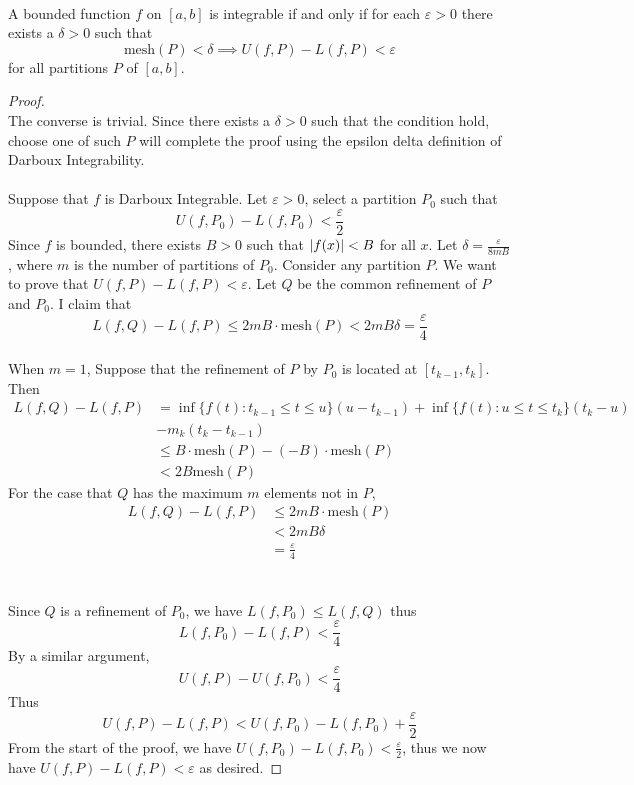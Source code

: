 \documentclass[a4paper]{article}
\begin{document}
\begin{thm}{}{}\\ A bounded function $f$ on $[a,b]$ is integrable if and only if for each $\varepsilon>0$ there exists a $\delta>0$ such that $$\text{mesh}(P)<\delta\implies U(f,P)-L(f,P)<\varepsilon$$ for all partitions $P$ of $[a,b]$. 
\begin{proof}\\ The converse is trivial. Since there exists a $\delta>0$ such that the condition hold, choose one of such $P$ will complete the proof using the epsilon delta definition of Darboux Integrability. \\~\\
Suppose that $f$ is Darboux Integrable. Let $\varepsilon>0$, select a partition $P_0$ such that $$U(f,P_0)-L(f,P_0)<\frac{\varepsilon}{2}$$ Since $f$ is bounded, there exists $B>0$ such that $\abs{f(x)}<B$ for all $x$. Let $\delta
=\frac{\varepsilon}{8mB}$, where $m$ is the number of partitions of $P_0$. Consider any partition $P$. We want to prove that $U(f,P)-L(f,P)<\varepsilon$. Let $Q$ be the common refinement of $P$ and $P_0$. I claim that $$L(f,Q)-L(f,P)\leq 2mB\cdot\text{mesh}(P)<2mB\delta=\frac{\varepsilon}{4}$$\\
When $m=1$, Suppose that the refinement of $P$ by $P_0$ is located at $[t_{k-1},t_k]$. Then 
\begin{align*}
L(f,Q)-L(f,P)&=\inf\{f(t):t_{k-1}\leq t\leq u\}(u-t_{k-1})+\inf\{f(t):u\leq t\leq t_k\}(t_k-u)\\
&-m_k(t_k-t_{k-1})\\
&\leq B\cdot\text{mesh}(P)-(-B)\cdot\text{mesh}(P)\tag{$-B$ is a minimum of $f(x)$}\\
&<2B\text{mesh}(P)
\end{align*}
For the case that $Q$ has the maximum $m$ elements not in $P$, 
\begin{align*}
L(f,Q)-L(f,P)&\leq 2mB\cdot\text{mesh}(P)\tag{Same argument as the case for $m=1$}\\
&<2mB\delta\\
&=\frac{\varepsilon}{4}\tag{constructed $\delta$}
\end{align*}
\\~\\
Since $Q$ is a refinement of $P_0$, we have $L(f,P_0)\leq L(f,Q)$ thus $$L(f,P_0)-L(f,P)<\frac{\varepsilon}{4}$$ By a similar argument, $$U(f,P)-U(f,P_0)<\frac{\varepsilon}{4}$$
Thus $$U(f,P)-L(f,P)<U(f,P_0)-L(f,P_0)+\frac{\varepsilon}{2}$$ From the start of the proof, we have $U(f,P_0)-L(f,P_0)<\frac{\varepsilon}{2}$, thus we now have $U(f,P)-L(f,P)<\varepsilon$ as desired. 
\end{proof}
\end{thm}
\end{document}
